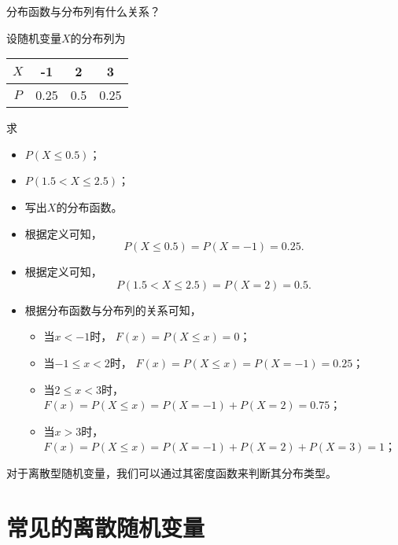 \begin{problem}
    分布函数与分布列有什么关系？
\end{problem}
\vspace{5cm}

\begin{example}
    设随机变量$X$的分布列为
    \begin{table}[ht]
        \centering
        \begin{tabular}{c c c c}
        \hline
          $X$ &  -1 & 2 & 3 \\
        \hline
        $P$ & 0.25 & 0.5 & 0.25 \\
        \hline
        \end{tabular}
    \end{table}
    求
    \begin{itemize}
        \item $P(X\leq 0.5)$；
        \item $P(1.5<X\leq 2.5)$；
        \item 写出$X$的分布函数。
    \end{itemize}
\end{example}
\begin{solution}
    \begin{itemize}
        \item 根据定义可知，$$P(X\leq 0.5) = P(X=-1) = 0.25.$$
        \item 根据定义可知，
        $$
        P(1.5<X\leq 2.5) = P(X=2) = 0.5.
        $$
        \item 根据分布函数与分布列的关系可知，
        \begin{itemize}
            \item 当$x<-1$时， $F(x) = P(X\leq x) =0$；
            \item 当$-1\leq x<2$时， $F(x) = P(X\leq x) =P(X=-1) = 0.25$；
            \item 当$2\leq x<3$时， $F(x) = P(X\leq x) =P(X=-1) + P(X=2) = 0.75$；
            \item 当$x>3$时， $F(x) = P(X\leq x) =P(X=-1) + P(X=2) + P(X=3) =1$；
        \end{itemize}
    \end{itemize}
\end{solution}
\begin{remark}
    对于离散型随机变量，我们可以通过其密度函数来判断其分布类型。
\end{remark}

\section{常见的离散随机变量}
